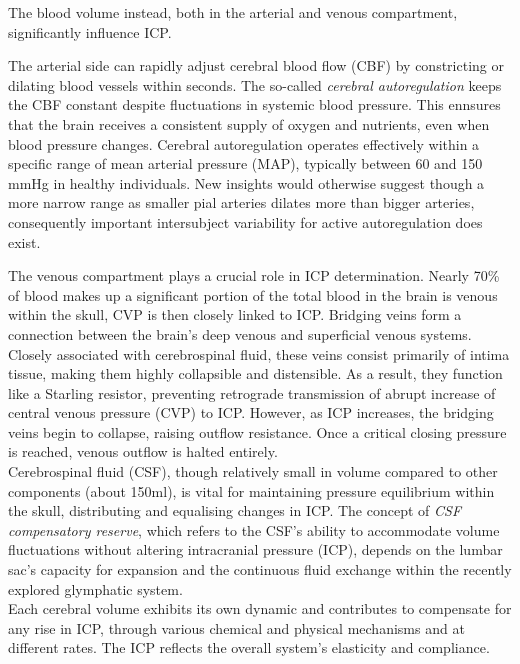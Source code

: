 The blood volume instead, both in the arterial and venous compartment, significantly influence ICP. 

The arterial side can rapidly adjust cerebral blood flow (CBF) by constricting or dilating blood vessels within seconds. The so-called \textit{cerebral autoregulation} keeps the CBF constant despite fluctuations in systemic blood pressure. This ennsures that the brain receives a consistent supply of oxygen and nutrients, even when blood pressure changes. Cerebral autoregulation operates effectively within a specific range of mean arterial pressure (MAP), typically between 60 and 150 mmHg in healthy individuals. New insights would otherwise suggest though a more narrow range as smaller pial arteries dilates more than bigger arteries, consequently important intersubject variability for active autoregulation does exist\cite{kleinDifferentialHemodynamicResponse2022}. 

The venous compartment plays a crucial role in ICP determination. Nearly 70\% of blood makes up a significant portion of the total blood in the brain is venous within the skull, CVP is then closely linked to ICP. Bridging veins form a connection between the brain’s deep venous and superficial venous systems. Closely associated with cerebrospinal fluid, these veins consist primarily of intima tissue, making them highly collapsible and distensible. As a result, they function like a Starling resistor, preventing retrograde transmission of abrupt increase of central venous pressure (CVP) to ICP. However, as ICP increases, the bridging veins begin to collapse, raising outflow resistance. Once a critical closing pressure is reached, venous outflow is halted entirely\cite{wilsonMonroKellie20Dynamic2016}.\\

Cerebrospinal fluid (CSF), though relatively small in volume compared to other components (about 150ml), is vital for maintaining pressure equilibrium within the skull, distributing and equalising changes in ICP. The concept of \textit{CSF compensatory reserve}, which refers to the CSF’s ability to accommodate volume fluctuations without altering intracranial pressure (ICP), depends on the lumbar sac’s capacity for expansion and the continuous fluid exchange within the recently explored glymphatic system\cite{cuccioliniIntracranialPressureClinicians2023a}.\\

Each cerebral volume exhibits its own dynamic and contributes to compensate for any rise in ICP, through various chemical and physical mechanisms and at different rates. The ICP reflects the overall system’s elasticity and compliance.\\

